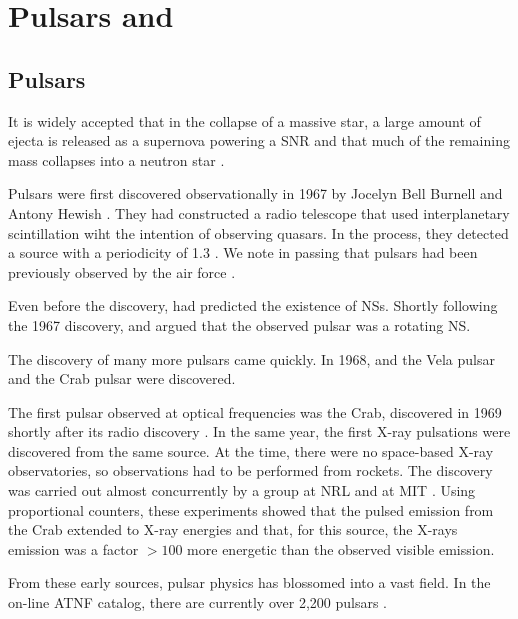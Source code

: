 \section{Pulsars and }

\subsection{Pulsars}

It is widely accepted that in the collapse of a massive star, a large
amount of ejecta is released as a supernova powering a \ac{SNR}
and that much of the remaining mass collapses into a neutron star
\citep{baade_1934a_remarks-super-novae}.

Pulsars were first discovered observationally in 1967 by Jocelyn Bell
Burnell and Antony Hewish \citep{hewish_1968_observation-rapidly}. They
had constructed a radio telescope that used interplanetary scintillation
wiht the intention of observing quasars.  In the process, they
detected a source with a periodicity of 1.3 \second. We note in
passing that pulsars had been previously observed by the air force
\citep{brumfiel_2007_force-early}.

Even before the discovery, \cite{pacini_1967_energy-emission}
had predicted the existence of \acp{NS}.  Shortly following
the 1967 discovery, \cite{gold_1968_rotating-neutron} and
\cite{pacini_1968_rotating-neutron} argued that the observed pulsar was
a rotating \ac{NS}.

The discovery of many more pulsars came quickly.  In 1968, and the
Vela pulsar \citep{large_1968_pulsar-supernova} and the Crab pulsar
\citep{staelin_1968_pulsating-radio} were discovered.

The first pulsar observed at optical frequencies was the
Crab, discovered in 1969 shortly after its radio discovery
\citep{cocke_1969_discovery-optical}.  In the same year, the first X-ray
pulsations were discovered from the same source. At the time, there were
no space-based X-ray observatories, so observations had to be performed
from rockets.  The discovery was carried out almost concurrently by
a group at \gls{NRL} \citep{fritz_1969_x-ray-pulsar} and at \gls{MIT}
\citep{bradt_1969_x-ray-optical}.  Using proportional counters, these
experiments showed that the pulsed emission from the Crab extended to
X-ray energies and that, for this source, the X-rays emission was a
factor $>100$ more energetic than the observed visible emission.

From these early sources, pulsar physics has blossomed into a vast
field. In the on-line \ac{ATNF} catalog, there are currently over 2,200
pulsars \citep{manchester_2005a_australia-telescope}.

